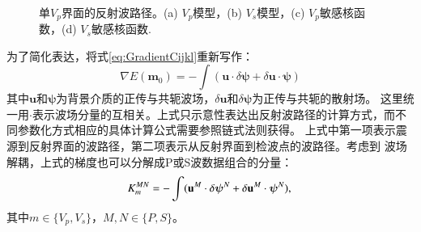 \begin{figure}[!htb]
   \\
   \caption{单$V_p$界面的反射波路径。(a) $V_p$模型，(b) $V_s$模型，(c) $V_p$敏感核函数，(d) 
   $V_s$敏感核函数.}
   \label{fig:kernel1_vp}
\end{figure}

为了简化表达，将式\eqref{eq:GradientCijkl}重新写作：
\begin{equation}
    \nabla E(
    \mathbf{m}_0)=-\int(
    \mathbf{u}\cdot\delta \boldsymbol{\psi}
    +\delta
    \mathbf{u}\cdot{\boldsymbol{\psi}})
    \label{eq:kernelgradient} 
\end{equation} 
其中$\mathbf{u}$和$\boldsymbol{\psi}$为背景介质的正传与共轭波场，$\delta\mathbf{u}$和$\delta \boldsymbol{\psi}$为正传与共轭的散射场。
这里统一用$\cdot$表示波场分量的互相关。上式只示意性表达出反射波路径的计算方式，而不同参数化方式相应的具体计算公式需要参照链式法则获得。
上式中第一项表示震源到反射界面的波路径，第二项表示从反射界面到检波点的波路径。考虑到
波场解耦，上式的梯度也可以分解成P或S波数据组合的分量：
\begin{equation}
    K_m^{MN}     
    =-\int(\mathbf{u}^M\cdot\delta \boldsymbol{\psi}^N
    +\delta  \mathbf{u}^M\cdot\boldsymbol{\psi}^N),\\
    \label{eq:decompkernel} 
\end{equation}
其中$m\in\{V_p, V_s\}$，$M,N\in\{P,S\}$。

